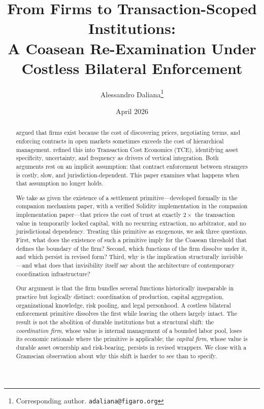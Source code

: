 \documentclass[11pt,a4paper]{article}
\title{%
  From Firms to Transaction-Scoped Institutions:\\
  A Coasean Re-Examination Under Costless Bilateral Enforcement%
}
\author{
  Alessandro Daliana\thanks{Corresponding author. \texttt{adaliana@figaro.org}}
}
\date{April 2026}
\theoremstyle{definition}
\theoremstyle{remark}
\begin{document}
\maketitle

\begin{abstract}
\citet{coase1937} argued that firms exist because the cost of
discovering prices, negotiating terms, and enforcing contracts in open
markets sometimes exceeds the cost of hierarchical management.
\citet{williamson1985} refined this into Transaction Cost Economics
(TCE), identifying asset specificity, uncertainty, and frequency as
drivers of vertical integration. Both arguments rest on an implicit
assumption: that contract enforcement between strangers is costly,
slow, and jurisdiction-dependent. This paper examines what happens
when that assumption no longer holds.

We take as given the existence of a settlement primitive---developed
formally in the companion mechanism paper, with a
verified Solidity implementation in the companion implementation
paper---that prices
the cost of trust at exactly $2\times$ the transaction value in
temporarily locked capital, with no recurring extraction, no
arbitrator, and no jurisdictional dependency. Treating this primitive
as exogenous, we ask three questions. First, what does the existence
of such a primitive imply for the Coasean threshold that defines the
boundary of the firm? Second, which functions of the firm dissolve
under it, and which persist in revised form? Third, why is the
implication structurally invisible---and what does that invisibility
itself say about the architecture of contemporary coordination
infrastructure?

Our argument is that the firm bundles several functions historically
inseparable in practice but logically distinct: coordination of
production, capital aggregation, organizational knowledge,
risk pooling, and legal personhood. A costless bilateral enforcement
primitive dissolves the first while leaving the others largely
intact. The result is not the abolition of durable institutions but a
structural shift: the \emph{coordination firm}, whose value is
internal management of a bounded labor pool, loses its economic
rationale where the primitive is applicable; the \emph{capital firm},
whose value is durable asset ownership and risk-bearing, persists in
revised wrappers. We close with a Gramscian observation about why
this shift is harder to see than to specify.
\end{abstract}
\end{document}

